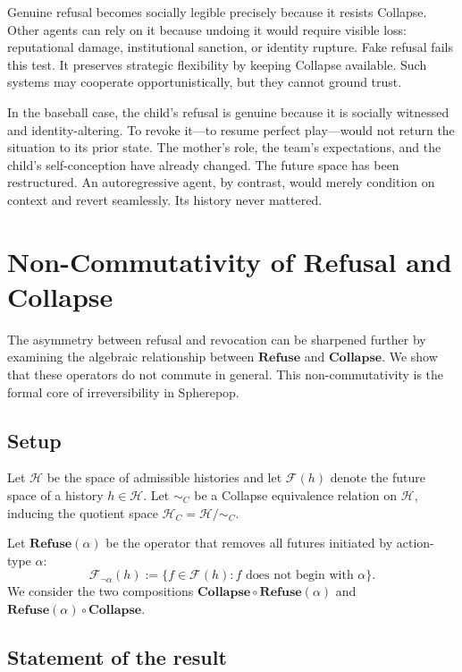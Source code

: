 \documentclass[11pt]{article}
\begin{document}
Genuine refusal becomes socially legible precisely because it resists Collapse.
Other agents can rely on it because undoing it would require visible loss:
reputational damage, institutional sanction, or identity rupture. Fake refusal
fails this test. It preserves strategic flexibility by keeping Collapse
available. Such systems may cooperate opportunistically, but they cannot ground
trust.

In the baseball case, the child's refusal is genuine because it is socially
witnessed and identity-altering. To revoke it---to resume perfect play---would
not return the situation to its prior state. The mother's role, the team's
expectations, and the child's self-conception have already changed. The future
space has been restructured. An autoregressive agent, by contrast, would merely
condition on context and revert seamlessly. Its history never mattered.

\section{Non-Commutativity of Refusal and Collapse}
\label{sec:noncomm}

The asymmetry between refusal and revocation can be sharpened further by
examining the algebraic relationship between $\mathbf{Refuse}$ and
$\mathbf{Collapse}$. We show that these operators do not commute in general.
This non-commutativity is the formal core of irreversibility in Spherepop.

\subsection{Setup}

Let $\mathcal{H}$ be the space of admissible histories and let
$\mathcal{F}(h)$ denote the future space of a history $h \in \mathcal{H}$.
Let $\sim_C$ be a Collapse equivalence relation on $\mathcal{H}$, inducing the
quotient space $\mathcal{H}_C = \mathcal{H}/\sim_C$.

Let $\mathbf{Refuse}(\alpha)$ be the operator that removes all futures
initiated by action-type $\alpha$:
\[
\mathcal{F}_{\neg \alpha}(h) := \{ f \in \mathcal{F}(h) : f \text{ does not begin with } \alpha \}.
\]
We consider the two compositions
$\mathbf{Collapse} \circ \mathbf{Refuse}(\alpha)$ and
$\mathbf{Refuse}(\alpha) \circ \mathbf{Collapse}$.

\subsection{Statement of the result}
\end{document}
